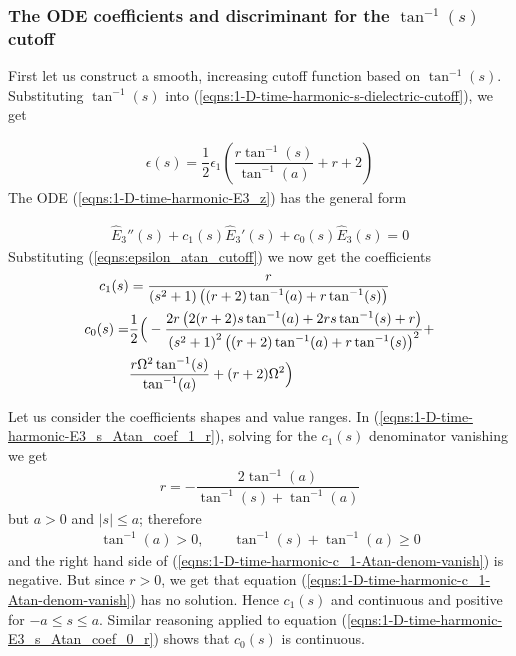 \documentclass[12pt,twoside]{article}
\begin{document}
\subsubsection{The ODE coefficients and discriminant for the $\tan^{-1}(s)$ cutoff  }
First let us construct a smooth, increasing cutoff function based on $\tan^{-1}(s)$. Substituting $\tan^{-1}(s)$ into (\ref{eqns:1-D-time-harmonic-s-dielectric-cutoff}), we get

\begin{align}
\label{eqns:epsilon_atan_cutoff}
\epsilon(s) = \dfrac{1}{2} \epsilon_1 \left(\dfrac{r \tan ^{-1}(s)}{\tan^{-1}(a)}+r+2\right)
\end{align}
The ODE (\ref{eqns:1-D-time-harmonic-E3_z}) has the general form 

\begin{align}
\label{eqns:general_ODE_form}
\hat{E}_3''(s) + c_1(s) \hat{E}_3'(s) + c_0(s)\hat{E}_3(s) = 0
\end{align}
Substituting (\ref{eqns:epsilon_atan_cutoff}) we now get the coefficients
\begin{subequations}
\begin{align}
c_1(s) &= \dfrac{r}{\left(s^2+1\right) \left((r+2) \tan ^{-1}(a)+r \tan ^{-1}(s)\right)} \label{eqns:1-D-time-harmonic-E3_s_Atan_coef_1_r}\\
c_0(s) = &\dfrac{1}{2} \Big(-\dfrac{2 r \left(2 (r+2) s \tan ^{-1}(a)+2 r s \tan
   ^{-1}(s)+r\right)}{\left(s^2+1\right)^2 \left((r+2) \tan ^{-1}(a)+r \tan
   ^{-1}(s)\right)^2}+\notag\\
   &\dfrac{r \Omega ^2 \tan ^{-1}(s)}{\tan ^{-1}(a)}+(r+2) \Omega
   ^2\Big)
 \label{eqns:1-D-time-harmonic-E3_s_Atan_coef_0_r}
\end{align}
\end{subequations}

Let us consider the coefficients shapes and value ranges. In (\ref{eqns:1-D-time-harmonic-E3_s_Atan_coef_1_r}), solving for the $c_1(s)$ denominator vanishing we get
\begin{align}
\label{eqns:1-D-time-harmonic-c_1-Atan-denom-vanish}
r = -\dfrac{2 \tan ^{-1}(a)}{\tan ^{-1}(
   s)+\tan ^{-1}(a)}
\end{align}
but $a>0$ and $|s|\leq a$; therefore
\begin{align*}
\tan ^{-1}(a) > 0, \qquad \tan ^{-1}(s)+\tan ^{-1}(a) \geq 0
\end{align*}
and the right hand side of (\ref{eqns:1-D-time-harmonic-c_1-Atan-denom-vanish}) is negative. But since $r>0$, we get that equation (\ref{eqns:1-D-time-harmonic-c_1-Atan-denom-vanish}) has no solution. Hence $c_1(s)$ and continuous and positive for $-a \leq s \leq a$. Similar reasoning applied to equation (\ref{eqns:1-D-time-harmonic-E3_s_Atan_coef_0_r}) shows that $c_0(s)$ is continuous.\\
\end{document}
